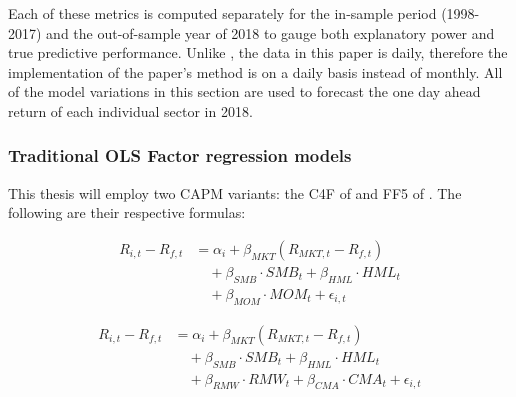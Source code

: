 Each of these metrics is computed separately for the in-sample period (1998-2017) and the out-of-sample year of 2018 to gauge both explanatory power and true predictive performance. Unlike , the data in this paper is daily, therefore the implementation of the paper's method is on a daily basis instead of monthly. All of the model variations in this section are used to forecast the one day ahead return of each individual sector in 2018. 

\subsubsection{Traditional OLS Factor regression models}
This thesis will employ two CAPM variants: the C4F of  and FF5 of . The following are their respective formulas:

\begin{equation}
    \label{eq:c4f}
    \begin{split}
        R_{i,t} - R_{f,t} &= \alpha_i + \beta_{MKT} (R_{MKT,t} - R_{f,t}) \\
        &\quad + \beta_{SMB} \cdot SMB_t + \beta_{HML} \cdot HML_t \\
        &\quad + \beta_{MOM} \cdot MOM_t + \epsilon_{i,t}
    \end{split}
\end{equation}

\begin{equation}
    \label{eq:ff5}
    \begin{split}
        R_{i,t} - R_{f,t} &= \alpha_i + \beta_{MKT} (R_{MKT,t} - R_{f,t}) \\
        &\quad + \beta_{SMB} \cdot SMB_t + \beta_{HML} \cdot HML_t \\
        &\quad + \beta_{RMW} \cdot RMW_t + \beta_{CMA} \cdot CMA_t + \epsilon_{i,t}
    \end{split}
\end{equation}

